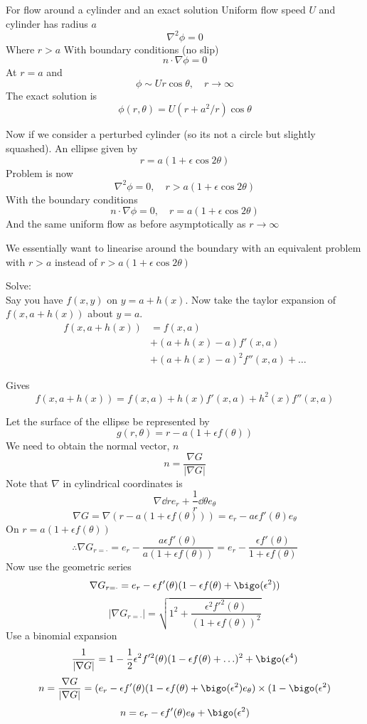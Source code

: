 \documentclass{/home/janmebows/Documents/LatexTemplates/myassignment}
\begin{document}
For flow around a cylinder and an exact solution
Uniform flow speed $U$ and cylinder has radius $a$
\[\nabla^2 \phi = 0\]
Where $r>a$
With boundary conditions (no slip)
\[n \cdot \nabla \phi = 0\]
At $r=a$ and
\[\phi \sim Ur\cos\theta, \quad r\to\infty\]
The exact solution is
\[\phi(r,\theta) = U (r + a^2/r) \cos\theta\]

Now if we consider a perturbed cylinder (so its not a circle but slightly squashed).
An ellipse given by
\[r = a(1+\epsilon\cos2\theta)\]
Problem is now
\[\nabla^2 \phi = 0 ,\quad r > a(1+\epsilon\cos2\theta)\]
With the boundary conditions
\[n\cdot \nabla\phi = 0, \quad r=a(1+\epsilon\cos2\theta)\]
And the same uniform flow as before asymptotically as $r\to\infty$

We essentially want to linearise around the boundary with an equivalent problem with $r>a$ instead of $r>a(1+\epsilon\cos2\theta)$

Solve:\\
Say you have $f(x,y)$ on $y=a + h(x)$. Now take the taylor expansion of $f(x,a+h(x))$ about $y=a$.
\begin{align*}
f(x,a+h(x)) &= f(x,a)\\
&+(a+h(x)-a) f'(x,a)\\
&+(a+h(x)-a)^2 f''(x,a) + \hdots
\end{align*}

Gives
\[f(x,a+h(x)) = f(x,a) + h(x)f'(x,a) + h^2(x) f''(x,a)\]

Let the surface of the ellipse be represented by
\[g(r,\theta) = r - a(1+\epsilon f(\theta))\]
We need to obtain the normal vector, $n$
\[n = \frac{\nabla G}{|\nabla G|} \]
Note that $\nabla$ in cylindrical coordinates is
\[\nabla \dd{}r e_r + \frac1r \dd{}\theta e_\theta\]
\[\nabla G = \nabla(r - a(1+\epsilon f(\theta))) = e_r - a\epsilon f'(\theta) e_\theta\]
On $r = a(1+\epsilon f(\theta))$
\[\therefore \nabla G_{r=\cdot} = e_r - \frac{a \epsilon f'(\theta)}{a(1+\epsilon f(\theta))} = e_r - \frac{\epsilon f'(\theta)}{1+\epsilon f(\theta)}\]
Now use the geometric series
\[\nabla G_{r=\cdot} = e_r - \epsilon f'(\theta) (1-\epsilon f(\theta) + \bigo(\epsilon^2))\]
\[|\nabla G_{r=\cdot}| = \sqrt{1^2 + \frac{\epsilon^2 f'^2(\theta)}{(1+\epsilon f(\theta))^2}}\]
Use a binomial expansion
\[\frac1{|\nabla G|} = 1 - \frac12 \epsilon^2 f'^2(\theta)(1-\epsilon f(\theta) + \hdots)^2 + \bigo(\epsilon^4)\]
\[n = \frac{\nabla G}{|\nabla G|} = (e_r - \epsilon f'(\theta) (1-\epsilon f(\theta) + \bigo(\epsilon^2) e_\theta) \times (1- \bigo(\epsilon^2)\]
\[n = e_r - \epsilon f'(\theta)e_\theta + \bigo(\epsilon^2)\]
\end{document}
